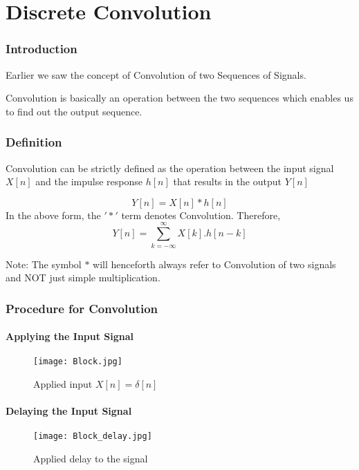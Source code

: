 \pagebreak
\chapter{Discrete Convolution}

\setcounter{section}{0}

\subsection{Introduction}

Earlier we saw the concept of Convolution of two Sequences of Signals. 

Convolution is basically an operation between the two sequences which enables us to find out the output sequence. 

\subsection{Definition}
Convolution can be strictly defined as the operation between the input signal $X[n]$ and the impulse response $h[n]$ that results in the output $Y[n]$

$$Y[n]=X[n]*h[n]$$
In the above form, the $'*'$ term denotes Convolution. 
Therefore, $$Y[n]=\sum_{k=-\infty}^{\infty} X[k].h[n-k]$$


Note: The symbol $*$ will henceforth always refer to Convolution of two signals and NOT just simple multiplication.

\subsection{Procedure for Convolution}
\subsubsection{Applying the Input Signal}

\begin{figure}[ht]
\centering
\texttt{[image: Block.jpg]}
\caption{\label{Step 1:} Applied input $X[n]=\delta[n]$}
\end{figure}


\subsubsection{Delaying the Input Signal}

\begin{figure}[ht]
\centering
\texttt{[image: Block\_delay.jpg]}
\caption{\label{Step 2:} Applied delay to the signal}
\end{figure}
\pagebreak



